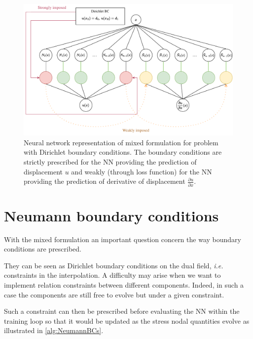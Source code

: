 
\begin{figure}
    \centering
    \includegraphics[trim={0 0 0 0},clip,width = 0.9\linewidth]{Figures/BC_1.drawio.pdf}    
    \caption{Neural network representation of mixed formulation for problem with Dirichlet boundary conditions. The boundary conditions are strictly prescribed for the NN providing the prediction of displacement $u$ and weakly (through loss function) for the NN providing the prediction of derivative of displacement $\frac{\partial u}{\partial x}$.   }
    \label{fig:BCsMixed}
\end{figure}


\section{Neumann boundary conditions}

With the mixed formulation an important question concern the way boundary conditions are prescribed.

They can be seen as Dirichlet boundary conditions on the dual field, \emph{i.e.} constraints in the interpolation. A difficulty may arise when we want to implement relation constraints between different components. Indeed, in such a case the components are still free to evolve but under a given constraint.

Such a constraint can then be prescribed before evaluating the NN within the training loop so that it would be updated as the stress nodal quantities evolve as illustrated in \cref{alg:NeumannBCs}.



